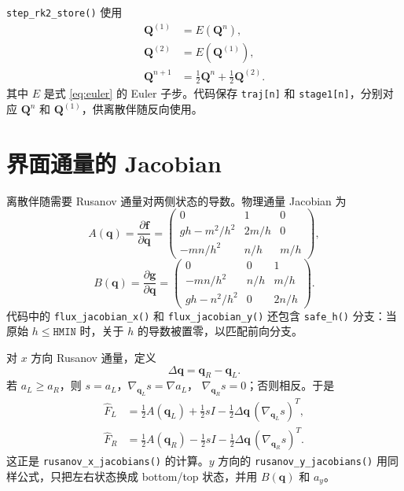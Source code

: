 \documentclass[12pt,a4paper]{article}
\begin{document}
\texttt{step\_rk2\_store()} 使用
\begin{align}
\mathbf{Q}^{(1)} &= E(\mathbf{Q}^n),\\
\mathbf{Q}^{(2)} &= E(\mathbf{Q}^{(1)}),\\
\mathbf{Q}^{n+1} &= \frac12\mathbf{Q}^{n}+\frac12\mathbf{Q}^{(2)}.
\label{eq:rk2}
\end{align}
其中 $E$ 是式 \eqref{eq:euler} 的 Euler 子步。代码保存
\texttt{traj[n]} 和 \texttt{stage1[n]}，分别对应 $\mathbf{Q}^n$ 和
$\mathbf{Q}^{(1)}$，供离散伴随反向使用。

\section{界面通量的 Jacobian}

离散伴随需要 Rusanov 通量对两侧状态的导数。物理通量 Jacobian 为
\begin{equation}
A(\mathbf{q})=\frac{\partial\mathbf{f}}{\partial\mathbf{q}}
=
\begin{pmatrix}
0 & 1 & 0\\
gh-m^2/h^2 & 2m/h & 0\\
-mn/h^2 & n/h & m/h
\end{pmatrix},
\label{eq:Ax}
\end{equation}
\begin{equation}
B(\mathbf{q})=\frac{\partial\mathbf{g}}{\partial\mathbf{q}}
=
\begin{pmatrix}
0 & 0 & 1\\
-mn/h^2 & n/h & m/h\\
gh-n^2/h^2 & 0 & 2n/h
\end{pmatrix}.
\label{eq:Ay}
\end{equation}
代码中的 \texttt{flux\_jacobian\_x()} 和 \texttt{flux\_jacobian\_y()}
还包含 \texttt{safe\_h()} 分支：当原始 $h\le\mathtt{HMIN}$ 时，关于
$h$ 的导数被置零，以匹配前向分支。

对 $x$ 方向 Rusanov 通量，定义
\[
\Delta\mathbf{q}=\mathbf{q}_R-\mathbf{q}_L.
\]
若 $a_L\ge a_R$，则 $s=a_L$，$\nabla_{\mathbf{q}_L}s=\nabla a_L$，
$\nabla_{\mathbf{q}_R}s=0$；否则相反。于是
\begin{align}
\widehat{F}_L
&=
\frac12 A(\mathbf{q}_L)+\frac12sI
-\frac12\Delta\mathbf{q}\,(\nabla_{\mathbf{q}_L}s)^{T},
\label{eq:FL}\\
\widehat{F}_R
&=
\frac12 A(\mathbf{q}_R)-\frac12sI
-\frac12\Delta\mathbf{q}\,(\nabla_{\mathbf{q}_R}s)^{T}.
\label{eq:FR}
\end{align}
这正是 \texttt{rusanov\_x\_jacobians()} 的计算。$y$ 方向的
\texttt{rusanov\_y\_jacobians()} 用同样公式，只把左右状态换成
bottom/top 状态，并用 $B(\mathbf{q})$ 和 $a_y$。
\end{document}
